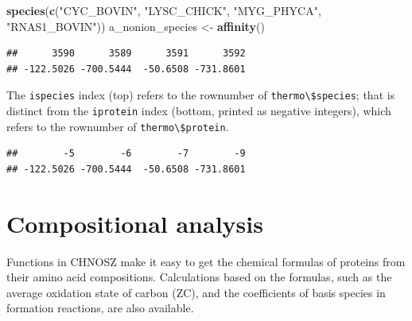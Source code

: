 \documentclass[]{tufte-book}
\newenvironment{Shaded}{}{}
\newcommand{\KeywordTok}[1]{\textcolor[rgb]{0.00,0.44,0.13}{\textbf{#1}}}
\newcommand{\StringTok}[1]{\textcolor[rgb]{0.25,0.44,0.63}{#1}}
\newcommand{\OperatorTok}[1]{\textcolor[rgb]{0.40,0.40,0.40}{#1}}
\newcommand{\NormalTok}[1]{#1}
\begin{document}
\begin{Shaded}
\begin{Highlighting}[]
\KeywordTok{species}\NormalTok{(}\KeywordTok{c}\NormalTok{(}\StringTok{"CYC_BOVIN"}\NormalTok{, }\StringTok{"LYSC_CHICK"}\NormalTok{, }\StringTok{"MYG_PHYCA"}\NormalTok{, }\StringTok{"RNAS1_BOVIN"}\NormalTok{))}
\NormalTok{a_nonion_species <-}\StringTok{ }\KeywordTok{affinity}\NormalTok{()}
\end{Highlighting}
\end{Shaded}

\begin{Shaded}
\end{Shaded}

\begin{verbatim}
##      3590      3589      3591      3592 
## -122.5026 -700.5444  -50.6508 -731.8601
\end{verbatim}

\begin{marginfigure}
The \texttt{ispecies} index (top) refers to the rownumber of
\texttt{thermo\textbackslash{}\$species}; that is distinct from the
\texttt{iprotein} index (bottom, printed as negative integers), which
refers to the rownumber of \texttt{thermo\textbackslash{}\$protein}.
\end{marginfigure}

\begin{Shaded}
\end{Shaded}

\begin{verbatim}
##        -5        -6        -7        -9 
## -122.5026 -700.5444  -50.6508 -731.8601
\end{verbatim}

\section{Compositional analysis}\label{compositional-analysis}

Functions in CHNOSZ make it easy to get the chemical formulas of
proteins from their amino acid compositions. Calculations based on the
formulas, such as the average oxidation state of carbon (ZC), and the
coefficients of basis species in formation reactions, are also
available.
\end{document}
